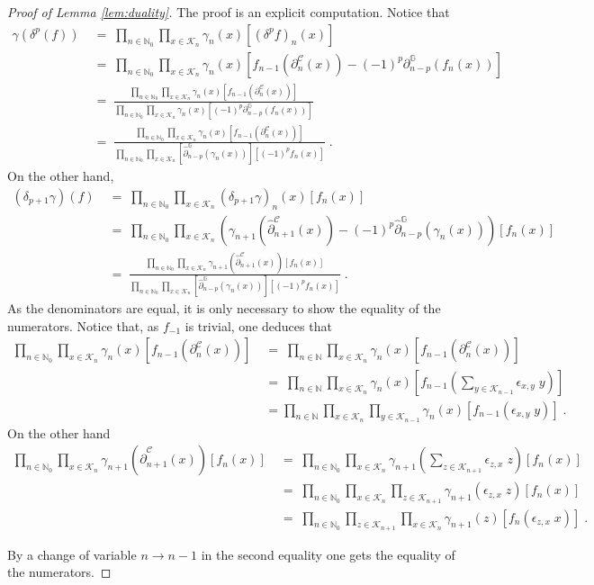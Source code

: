 \documentclass[a4paper,12pt,twoside,reqno]{amsart}
\theoremstyle{plain}
\theoremstyle{definition}
\theoremstyle{remark}
\numberwithin{equation}{section}
\numberwithin{figure}{section}
\numberwithin{table}{section}
\newcommand{\NN}{\mathbb{N}}
\newcommand{\f}[1]{\mathcal{#1}}
\newcommand{\n}[1]{\mathbb{#1}}
\begin{document}
	\begin{proof}[{Proof of Lemma \ref{lem:duality}}]
		The proof is an explicit computation.
		Notice that
		\begin{align*}
			\gamma(\delta^p (f))\;&=\;\prod_{n\in\NN_0}\prod_{x\in \f{K}_n}\gamma_n(x)[(\delta^p f)_n(x)]\\
			&=\;\prod_{n\in\NN_0}\prod_{x\in \f{K}_n}\gamma_n(x) [f_{n-1}(\partial^\f{C}_n (x))-(-1)^p\partial_{n-p}^\n{G} (f_n(x))]\\
			&=\;\frac{\prod_{n\in\NN_0}\prod_{x\in \f{K}_n}\gamma_n(x)[f_{n-1}(\partial_n^\f{C} (x))]}{\prod_{n\in\NN_0}\prod_{x\in \f{K}_n}\gamma_n(x)[(-1)^p\partial_{n-p}^\n{G} (f_n(x))]}\\
			&=\;\frac{\prod_{n\in\NN_0}\prod_{x\in \f{K}_n}\gamma_n(x)[f_{n-1}(\partial_n^\f{C} (x))]}{\prod_{n\in\NN_0}\prod_{x\in \f{K}_n}[\widehat{\partial}_{n-p}^\n{G}(\gamma_n(x))][(-1)^p f_n(x)]}\;.
		\end{align*}    
		On the other hand,
		\begin{align*}
			(\delta_{p+1}\gamma)(f)\;&=\;\prod_{n\in\NN_0}\prod_{x\in \f{K}_n} (\delta_{p+1}\gamma)_n(x)
			[f_n(x)]\\
			&=\;\prod_{n\in\NN_0}\prod_{x\in \f{K}_n}\left(\gamma_{n+1}(\widehat{\partial}_{n+1}^\f{C} (x))-(-1)^{p}\widehat{\partial}_{n-p}^\n{G}( \gamma_n(x))\right)[f_n(x)]\\
			&=\;\frac{\prod_{n\in\NN_0}\prod_{x\in \f{K}_n}\gamma_{n+1}(\widehat{\partial}_{n+1}^\f{C} (x))[f_{n}(x)]}{\prod_{n\in\NN_0}\prod_{x\in \f{K}_n}[\widehat{\partial}_{n-p}^\n{G}(\gamma_n(x))][(-1)^p f_n(x)]}\;.
		\end{align*}
		As the denominators are equal, it is only necessary to show the equality of the numerators.
		Notice that, as $f_{-1}$ is trivial, one deduces that
		\begin{align*}
			\prod_{n\in\NN_0}\prod_{x\in \f{K}_n}\gamma_n(x)[f_{n-1}(\partial_n^\f{C} (x))]\;&=\;  \prod_{n\in\NN}\prod_{x\in \f{K}_n}\gamma_n(x)[f_{n-1}(\partial_n^\f{C} (x))]\\\
			&=\;\prod_{n\in\NN}\prod_{x\in \f{K}_n}\gamma_n(x)\left[f_{n-1}\left(\sum_{y\in \f{K}_{n-1}}\epsilon_{x,y}\;y\right)\right]\\
			&=\prod_{n\in\NN}\prod_{x\in \f{K}_n}\prod_{y\in \f{K}_{n-1}}\gamma_n(x)[f_{n-1}(\epsilon_{x,y}\;y)]\;.
		\end{align*}
		On the other hand 
		\begin{align*}
			\prod_{n\in\NN_0}\prod_{x\in \f{K}_n}\gamma_{n+1}(\widehat{\partial}_{n+1}^\f{C} (x))[f_{n}(x)]\;&=\;\prod_{n\in\NN_0}\prod_{x\in \f{K}_n}\gamma_{n+1}\left(\sum_{z\in \f{K}_{n+1}} \epsilon_{z,x}\; z\right)[f_{n}(x)]\\
			&=\;\prod_{n\in\NN_0}\prod_{x\in \f{K}_n}\prod_{z\in \f{K}_{n+1}}\gamma_{n+1}( \epsilon_{z,x}\; z)[f_{n}(x)]\\
			&=\;\prod_{n\in\NN_0}\prod_{z\in \f{K}_{n+1}}\prod_{x\in \f{K}_n}\gamma_{n+1}( z)[f_{n}(\epsilon_{z,x}\;x)]\;.
		\end{align*}
		
		
		By a change of variable $n\to n-1$ in the second equality one gets the equality of the numerators.
	\end{proof}
	
\end{document}
